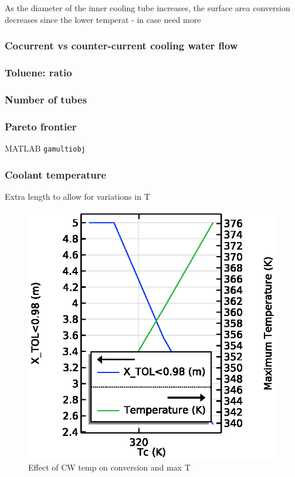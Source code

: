 As the diameter of the inner cooling tube increases, the surface area conversion decreases since the lower temperat
- in case need more


\subsubsection{Cocurrent vs counter-current cooling water flow}

\subsubsection{Toluene:  ratio}

\subsubsection{Number of tubes}

\subsubsection{Pareto frontier}
MATLAB \texttt{gamultiobj}

\subsubsection{Coolant temperature}
Extra length to allow for variations in T

\begin{figure}[h]
    \centering
    \includegraphics[width=0.49\linewidth]{figures/S4-CW-X-T.eps}
    \caption{Effect of CW temp on conversion and max T}
    \label{fig:comsol-S4-CW-X-T}
\end{figure}
